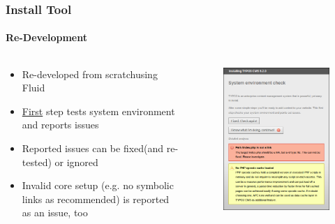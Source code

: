 \begin{frame}[fragile]
	\frametitle{Install Tool}
	\framesubtitle{Re-Development}

	\begin{columns}[T]

		\begin{column}{.5\textwidth}
			\begin{itemize}
				\item Re-developed from scratch\newline using Fluid
				\item \underline{First} step tests system environment and reports issues
				\item Reported issues can be fixed\newline (and re-tested) or ignored
				\item Invalid core setup (e.g. no symbolic links as recommended) is reported as an issue, too
			\end{itemize}
		\end{column}

		\begin{column}{.5\textwidth}
			\begin{figure}\vspace*{-0.4cm}
				\includegraphics[width=0.8\linewidth]{Images/InstallTool/SystemEnvironmentCheck.png}
			\end{figure}
		\end{column}

	\end{columns}

\end{frame}

